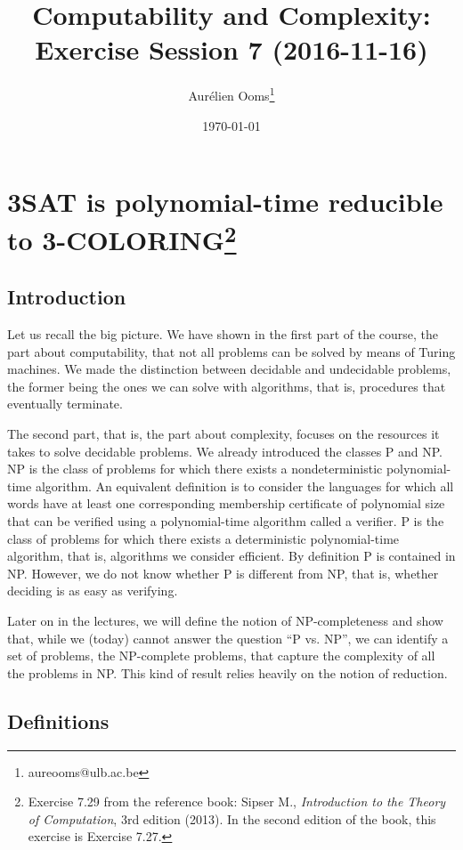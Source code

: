 \documentclass{article}
\title{Computability and Complexity:\\Exercise Session 7 (2016-11-16)}
\author{Aurélien Ooms\footnote{aureooms@ulb.ac.be}}
\date{\today}
\begin{document}
\maketitle
\tableofcontents

\section{3SAT is polynomial-time reducible to 3-COLORING\footnote{%
Exercise 7.29 from the reference book: Sipser M.,
\emph{Introduction to the Theory of Computation}, 3rd edition (2013).
In the second edition of the book, this exercise is Exercise 7.27.}}

\subsection{Introduction}

Let us recall the big picture. We have shown in the first part of the course,
the part about computability, that not all problems can be solved by means of
Turing machines. We made the distinction between decidable and undecidable
problems, the former being the ones we can solve with algorithms, that is,
procedures that eventually terminate.

The second part, that is, the part about complexity, focuses on the resources
it takes to solve decidable problems. We already introduced the classes P and
NP\@. NP is the class of problems for which there exists a nondeterministic
polynomial-time algorithm. An equivalent definition is to consider the
languages for which all words have at least one corresponding membership
certificate of polynomial size that can be verified using a polynomial-time
algorithm called a verifier. P is the class of problems for which there exists
a deterministic polynomial-time algorithm, that is, algorithms we consider
efficient. By definition P is contained in NP\@.
However, we do not know whether P is different from NP, that is, whether
deciding is as easy as verifying.

Later on in the lectures, we will define the notion of NP-completeness and show
that, while we (today) cannot answer the question ``P vs. NP'', we can identify
a set of problems, the NP-complete problems, that capture the complexity of all
the problems in NP\@. This kind of result relies heavily on the notion of
reduction.

\subsection{Definitions}
\end{document}
